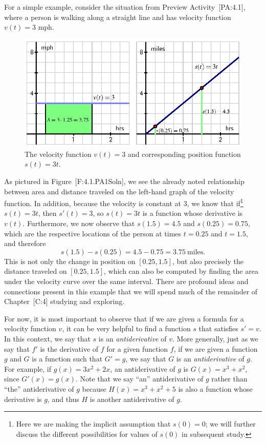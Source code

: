 For a simple example, consider the situation from Preview
Activity~{[}PA:4.1{]}, where a person is walking along a straight line
and has velocity function \(v(t) = 3\) mph.

\begin{figure}[htbp]
\centering
\includegraphics{figures/4_1_PA1Soln.eps}
\caption{The velocity function \(v(t) = 3\) and corresponding position
function \(s(t) = 3t\).{}}
\end{figure}

As pictured in Figure~{[}F:4.1.PA1Soln{]}, we see the already noted
relationship between area and distance traveled on the left-hand graph
of the velocity function. In addition, because the velocity is constant
at 3, we know that if\footnote{Here we are making the implicit
  assumption that \(s(0) = 0\); we will further discuss the different
  possibilities for values of \(s(0)\) in subsequent study.}
\(s(t) = 3t\), then \(s'(t) = 3\), so \(s(t) = 3t\) is a function whose
derivative is \(v(t)\). Furthermore, we now observe that
\(s(1.5) = 4.5\) and \(s(0.25) = 0.75\), which are the respective
locations of the person at times \(t = 0.25\) and \(t = 1.5\), and
therefore \[s(1.5) - s(0.25) = 4.5 - 0.75 = 3.75 \ \mbox{miles}.\] This
is not only the change in position on \([0.25,1.5]\), but also precisely
the distance traveled on \([0.25,1.5]\), which can also be computed by
finding the area under the velocity curve over the same interval. There
are profound ideas and connections present in this example that we will
spend much of the remainder of Chapter~{[}C:4{]} studying and exploring.

For now, it is most important to observe that if we are given a formula
for a velocity function \(v\), it can be very helpful to find a function
\(s\) that satisfies \(s' = v\). In this context, we say that \(s\) is
an \emph{antiderivative} of \(v\). More generally, just as we say that
\(f'\) is the derivative of \(f\) for a given function \(f\), if we are
given a function \(g\) and \(G\) is a function such that \(G' = g\), we
say that \(G\) is an \emph{antiderivative} of \(g\). For example, if
\(g(x) = 3x^2 + 2x\), an antiderivative of \(g\) is
\(G(x) = x^3 + x^2\), since \(G'(x) = g(x)\). Note that we say ``an''
antiderivative of \(g\) rather than ``the'' antiderivative of \(g\)
because \(H(x) = x^3 + x^2 + 5\) is also a function whose derivative is
\(g\), and thus \(H\) is another antiderivative of \(g\).

